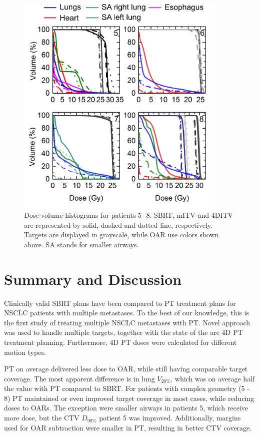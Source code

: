 \newpage
\begin{figure}[H]
	\begin{center}
		\includegraphics[width=0.9\textwidth]{./ComplexPatients/Images/DVH_legend.png}
		\caption{Dose volume histograms for patients 5 -8. SBRT, mITV and 4DITV are represented by solid, dashed and dotted line, respectively. Targets are displayed
		in grayscale, while OAR use colors shown above. SA stands for smaller airways.}
		\label{Fig:dvh}
	\end{center}
\end{figure}
\newpage


\section{Summary and Discussion}

Clinically valid SBRT plans have been compared to PT treatment plans for NSCLC patients with multiple metastases. 
To the best of our knowledge, this is the first study of treating multiple NSCLC metastases with PT. Novel approach was used to handle multiple targets, together
with the state of the are 4D PT treatment planning. Furthermore, 4D PT doses were calculated for different motion types. 

PT on average delivered less dose to OAR, while still having comparable target coverage.
The most apparent difference is in lung $V_{20\%}$, which was on average half the value with PT compared to SBRT.
For patients with complex geometry (5 - 8) PT maintained or even improved target coverage in most cases, while reducing doses to OARs.
The exception were smaller airways in patients 5, which receive more dose, but the CTV $D_{99\%}$ patient 5 was improved. 
Additionally, margins used for OAR subtraction were smaller in PT, resulting in better CTV coverage.

